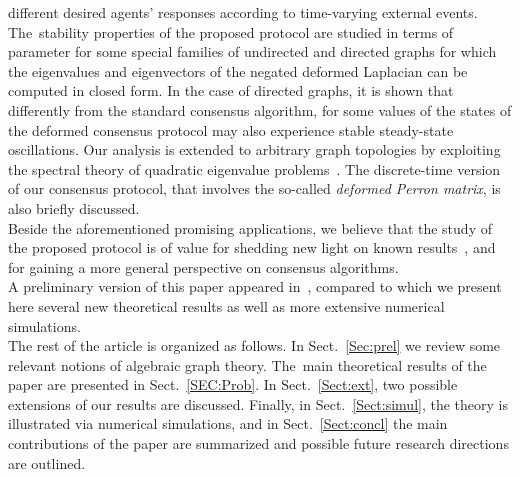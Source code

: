 \documentclass[letterpaper,9pt,twocolumn]{autart}
\begin{document}
different desired agents' responses according to time-varying external events. The~stability properties of the proposed protocol are studied in terms of parameter  for
some special families of undirected and directed graphs for which the
eigenvalues and eigenvectors of the negated deformed Laplacian can be
computed in closed form. In the case
of directed graphs, it is shown that differently from the standard
consensus algorithm, for some values of  the states of the deformed consensus protocol 
may also experience stable steady-state oscillations.
Our analysis is extended to arbitrary graph topologies by exploiting the spectral theory of quadratic eigenvalue problems~\cite{TisseurMe_SIAM01}.
The discrete-time version of our consensus protocol, that involves
the so-called \emph{deformed Perron matrix}, is also briefly
discussed.\\
Beside the aforementioned promising applications, we
believe that the study of the proposed protocol is of value for shedding 
new light on known results~\cite{OlfatiSaberMu_TAC04,RenBe_TAC05}, 
and for gaining a more general perspective on consensus algorithms.\\
A preliminary version of this paper appeared in~\cite{Morbidi_CDC12},
compared to which we present here several new theoretical results as
well as more extensive numerical simulations.\\
The rest of the article is organized as follows. In
Sect.~\ref{Sec:prel} we review some relevant notions of
algebraic graph theory. The~main theoretical results of the paper are presented in Sect.~\ref{SEC:Prob}.
In Sect.~\ref{Sect:ext}, two possible extensions of our results are discussed. Finally, in Sect.~\ref{Sect:simul}, 
the theory is illustrated via numerical simulations, and in Sect.~\ref{Sect:concl} the main contributions of
the paper are summarized and possible future research directions are outlined.
\end{document}
